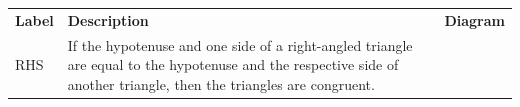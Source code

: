 \begin{table}[H]
    
        \begin{center}
      
      \label{m38380*id317997}
      
    \noindent
      \tablelasttail{}
      \begin{xtabular*}{\mytablewidth}[t]{|p{10\mystarwidth}|p{10\mystarwidth}|p{10\mystarwidth}|}\hline
    
    
        
                    \textbf{Label}
                   &
    
    
        
                    \textbf{Description}
                   &
    
    
        
                    \textbf{Diagram}
     \tabularnewline{}
    
    
        RHS &
    
    
        If the hypotenuse and one side of a right-angled triangle are equal to the hypotenuse and the respective side of another triangle, then the triangles are congruent. &
    

\end{xtabular*}
\end{center}
\end{table}

